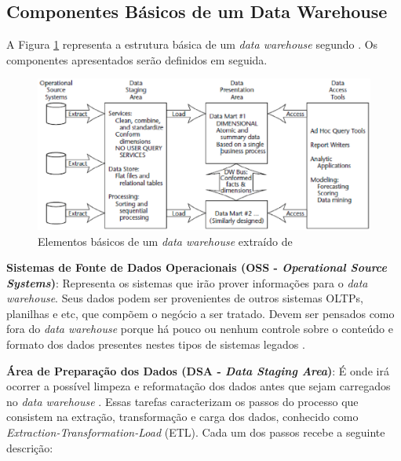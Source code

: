 \subsection{Componentes Básicos de um Data Warehouse}

A Figura \ref{fig:elem-bas-dw} representa a estrutura básica de um \textit{data warehouse} segundo . Os componentes apresentados serão definidos em seguida.

\begin{figure}[h!]
\centering
\includegraphics[keepaspectratio=false,scale=0.71]{figuras/figuras_pedro/elem-bas-dw.eps}
\caption{Elementos básicos de um \textit{data warehouse} extraído de }
\label{fig:elem-bas-dw}
\end{figure}
\FloatBarrier

\textbf{Sistemas de Fonte de Dados Operacionais (OSS - \textit{Operational Source Systems})}:
Representa os sistemas que irão prover informações para o \textit{data warehouse}. Seus dados podem ser provenientes de outros sistemas OLTPs, planilhas e etc, que compõem o negócio a ser tratado. Devem ser pensados como fora do \textit{data warehouse} porque há pouco ou nenhum controle sobre o conteúdo e formato dos dados presentes nestes tipos de sistemas legados \cite{Kimball2002}.

\textbf{Área de Preparação dos Dados (DSA - \textit{Data Staging Area})}:
É onde irá ocorrer a possível limpeza e reformatação dos dados antes que sejam carregados no \textit{data warehouse} \cite{elmasri_sistemas_2011}. Essas tarefas caracterizam os passos do processo que consistem na extração, transformação e carga dos dados, conhecido como \textit{Extraction-Transformation-Load} (ETL). Cada um dos passos recebe a seguinte descrição:

